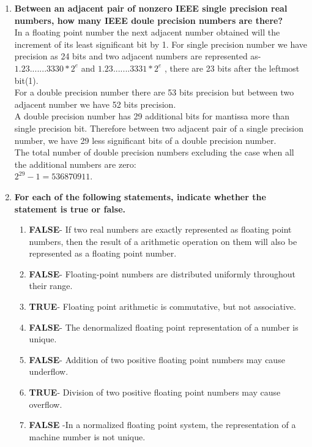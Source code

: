 \documentclass[12pt, oneside]{article}   	%
\begin{document}
\begin{enumerate}
 \hspace{3cm}
	\item \textbf{Between an adjacent pair of nonzero IEEE single precision real numbers, how many IEEE doule precision numbers are there?}\\
	
	In a floating point number the next adjacent number obtained will the increment of its least significant bit by 1.
	 For single precision number we have precision as 24 bits and two adjacent numbers are represented as- \\
	 $1.23.......3330  * 2^e$ and $1.23.......3331 *2^e$ , there are 23 bits after the leftmost bit(1).\\
	 
	 For a double precision number there are 53 bits precision but between two adjacent number we have 52 bits precision.\\
	 A double precision number has 29 additional bits for mantissa more  than single precision bit.
	 Therefore between two adjacent pair of a single precision number, we have 29 less significant bits of a double precision number.\\
	 The total number of double precision numbers  excluding the case when all the additional numbers are zero:\\ $2^{29} -1 = 536870911$.
	
	 \hspace{3cm}
	\item \textbf{For each of the following statements, indicate whether the statement is true or false.}
	\begin{enumerate}
		\item \textbf{FALSE}-
		If two real numbers are exactly represented as floating point numbers, then the result of a arithmetic operation on them will also be represented as a floating point number.
		\item \textbf{FALSE}- Floating-point numbers are distributed uniformly throughout their range.
		\item \textbf{TRUE}- Floating point arithmetic is commutative, but not associative.
		\item \textbf{FALSE}- The denormalized floating point representation of a number is unique.
		\item \textbf{FALSE}- Addition of two positive floating point numbers may cause underflow.
		\item \textbf{TRUE}- Division of two positive floating point numbers may cause overflow.
		\item \textbf{FALSE} -In a normalized floating point system, the representation of a machine number is not unique.
		

\end{enumerate}
\end{enumerate}
\end{document}
